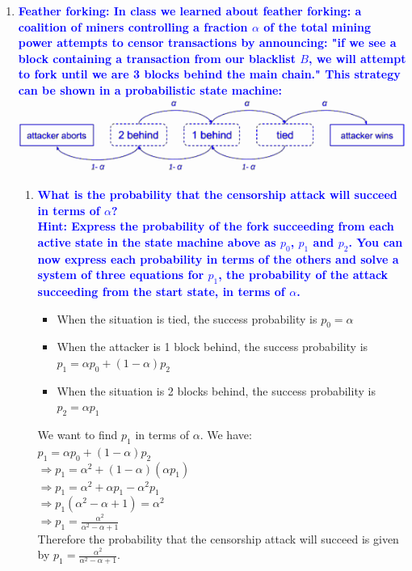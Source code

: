 \documentclass[11pt]{article}
\begin{document}
\begin{enumerate}
\item \textbf{\textcolor{blue}{Feather forking: In class we learned about feather forking: a coalition of miners controlling a fraction $\alpha$ of the total mining power attempts to censor transactions by announcing: "if we see a block containing a transaction from our blacklist $B$, we will attempt to fork until we are 3 blocks behind the main chain." This strategy can be shown in a probabilistic state machine:}}
    \newline
    \includegraphics{diagram0.png}
    \begin{enumerate}
    \item \textbf{\textcolor{blue}{What is the probability that the censorship attack will succeed in terms of $\alpha$?
    \\ Hint: Express the probability of the fork succeeding from each active state in the state machine above as $p_0$, $p_1$ and $p_2$. You can now express each probability in terms of the others and solve a system of three equations for $p_1$, the probability of the attack succeeding from the start state, in terms of $\alpha$.}}
        \begin{itemize}
            \item When the situation is tied, the success probability is $p_0 = \alpha$
            \item When the attacker is 1 block behind, the success probability is $p_1 = \alpha p_0 + (1-\alpha)p_2$
            \item When the situation is 2 blocks behind, the success probability is $p_2 = \alpha p_1$
        \end{itemize}
        We want to find $p_1$ in terms of $\alpha$. We have:
        \\ $p_1 = \alpha p_0 + (1-\alpha)p_2$
        \\ $\Rightarrow p_1 = \alpha^2 + (1-\alpha)(\alpha p_1)$
        \\ $\Rightarrow p_1 = \alpha^2 + \alpha p_1 - \alpha^2 p_1$
        \\ $\Rightarrow p_1(\alpha^2 - \alpha + 1) = \alpha^2$
        \\ $\Rightarrow p_1 = \frac{\alpha^2}{\alpha^2 - \alpha + 1}$
        \\ Therefore the probability that the censorship attack will succeed is given by $p_1 = \frac{\alpha^2}{\alpha^2 - \alpha + 1}$.

\end{enumerate}
\end{enumerate}
\end{document}
